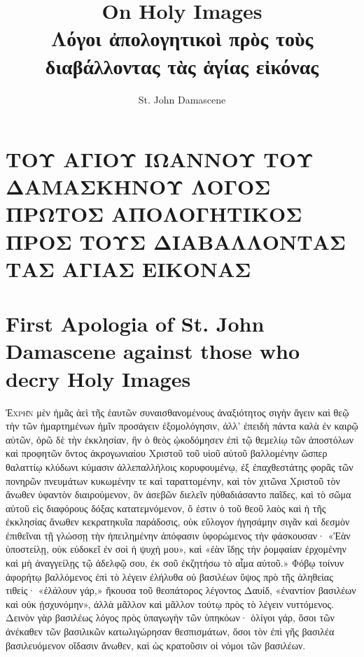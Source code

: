 \documentclass[10pt]{book}
\title{On Holy Images\\Λόγοι ἀπολογητικοὶ πρὸς τοὺς διαβάλλοντας τὰς ἁγίας εἰκόνας}
\author{St. John Damascene}
\newcommand{\switchGreek}[1][]{\selectlanguage{polutonikogreek} \switchcolumn*[#1]}
\newcommand{\switchEnglish}{\selectlanguage{english} \switchcolumn}
\begin{document}
\maketitle


\begin{paracol}{2}


\section*{ΤΟΥ ΑΓΙΟΥ ΙΩΑΝΝΟΥ ΤΟΥ ΔΑΜΑΣΚΗΝΟΥ ΛΟΓΟΣ ΠΡΩΤΟΣ ΑΠΟΛΟΓΗΤΙΚΟΣ ΠΡΟΣ ΤΟΥΣ ΔΙΑΒΑΛΛΟΝΤΑΣ ΤΑΣ ΑΓΙΑΣ ΕΙΚΟΝΑΣ}

\switchEnglish

\section*{First Apologia of St. John Damascene against those who decry Holy Images}

\switchGreek

\lettrine{Ἐ}{χρῆν} μὲν ἡμᾶς ἀεὶ τῆς ἑαυτῶν συναισθανομένους
ἀναξιότητος σιγὴν ἄγειν καὶ θεῷ τὴν τῶν ἡμαρτημένων ἡμῖν προσάγειν
ἐξομολόγησιν, ἀλλ’ ἐπειδὴ πάντα καλὰ ἐν καιρῷ αὐτῶν, ὁρῶ δὲ τὴν ἐκκλησίαν,
ἣν ὁ θεὸς ᾠκοδόμησεν ἐπὶ τῷ θεμελίῳ τῶν ἀποστόλων καὶ προφητῶν ὄντος
ἀκρογωνιαίου Χριστοῦ τοῦ υἱοῦ αὐτοῦ βαλλομένην ὥσπερ θαλαττίῳ κλύδωνι
κύμασιν ἀλλεπαλλήλοις κορυφουμένῳ, ἐξ ἐπαχθεστάτης φορᾶς τῶν πονηρῶν
πνευμάτων κυκωμένην τε καὶ ταραττομένην, καὶ τὸν χιτῶνα Χριστοῦ τὸν ἄνωθεν
ὑφαντὸν διαιρούμενον, ὃν ἀσεβῶν διελεῖν ηὐθαδιάσαντο παῖδες, καὶ τὸ σῶμα
αὐτοῦ εἰς διαφόρους δόξας κατατεμνόμενον, ὅ ἐστιν ὁ τοῦ θεοῦ λαὸς καὶ ἡ
τῆς ἐκκλησίας ἄνωθεν κεκρατηκυῖα παράδοσις, οὐκ εὔλογον ἡγησάμην σιγᾶν καὶ
δεσμὸν ἐπιθεῖναι τῇ γλώσσῃ τὴν ἠπειλημένην ἀπόφασιν ὑφορώμενος τὴν
φάσκουσαν· «Ἐὰν ὑποστείλῃ, οὐκ εὐδοκεῖ ἐν σοὶ ἡ ψυχή μου», καὶ «ἐὰν ἴδῃς
τὴν ῥομφαίαν ἐρχομένην καὶ μὴ ἀναγγείλῃς τῷ ἀδελφῷ σου, ἐκ σοῦ ἐκζητήσω τὸ
αἷμα αὐτοῦ.» Φόβῳ τοίνυν ἀφορήτῳ βαλλόμενος ἐπὶ τὸ λέγειν ἐλήλυθα οὐ
βασιλέων ὕψος πρὸ τῆς ἀληθείας τιθείς· «ἐλάλουν γάρ,» ἤκουσα τοῦ
θεοπάτορος λέγοντος Δαυίδ, «ἐναντίον βασιλέων καὶ οὐκ ᾐσχυνόμην», ἀλλὰ
μᾶλλον καὶ μᾶλλον τούτῳ πρὸς τὸ λέγειν νυττόμενος. Δεινὸν γὰρ βασιλέως
λόγος πρὸς ὑπαγωγὴν τῶν ὑπηκόων· ὀλίγοι γάρ, ὅσοι τῶν ἀνέκαθεν τῶν
βασιλικῶν κατωλιγώρησαν θεσπισμάτων, ὅσοι τὸν ἐπὶ γῆς βασιλέα
βασιλευόμενον οἴδασιν ἄνωθεν, καὶ ὡς κρατοῦσιν οἱ νόμοι τῶν βασιλέων.


\end{paracol}
\end{document}
